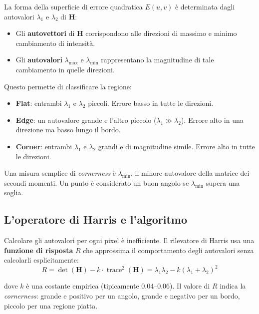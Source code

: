 \documentclass[12pt, a4paper]{report}
\DeclareMathOperator{\trace}{trace}
\begin{document}
La forma della superficie di errore quadratica $E(u,v)$ è determinata dagli
autovalori $\lambda_1$ e $\lambda_2$ di $\mathbf{H}$:

\begin{itemize}
  \item Gli \textbf{autovettori} di $\mathbf{H}$ corrispondono alle direzioni di
        massimo e minimo cambiamento di intensità.
  \item Gli \textbf{autovalori} $\lambda_{\max}$ e $\lambda_{\min}$ rappresentano
        la magnitudine di tale cambiamento in quelle direzioni.
\end{itemize}

Questo permette di classificare la regione:
\begin{itemize}
  \item \textbf{Flat}: entrambi $\lambda_1$ e $\lambda_2$ piccoli.  Errore basso in
        tutte le direzioni.
  \item \textbf{Edge}: un autovalore grande e l'altro piccolo
        ($\lambda_1 \gg \lambda_2$).  Errore alto in una direzione ma basso lungo
        il bordo.
  \item \textbf{Corner}: entrambi $\lambda_1$ e $\lambda_2$ grandi e di magnitudine
        simile.  Errore alto in tutte le direzioni.
\end{itemize}

\begin{notebox}
Una misura semplice di \emph{cornerness} è $\lambda_{\min}$, il minore autovalore
della matrice dei secondi momenti.  Un punto è considerato un buon angolo se
$\lambda_{\min}$ supera una soglia.
\end{notebox}

\subsection{L'operatore di Harris e l'algoritmo}

Calcolare gli autovalori per ogni pixel è inefficiente.  Il rilevatore di Harris usa
una \textbf{funzione di risposta} $R$ che approssima il comportamento degli autovalori
senza calcolarli esplicitamente:
\[
  R = \det(\mathbf{H}) - k\cdot\trace^2(\mathbf{H})
  = \lambda_1\lambda_2 - k(\lambda_1+\lambda_2)^2
\]

dove $k$ è una costante empirica (tipicamente 0.04--0.06).  Il valore di $R$ indica
la \emph{cornerness}: grande e positivo per un angolo, grande e negativo per un
bordo, piccolo per una regione piatta.
\end{document}
